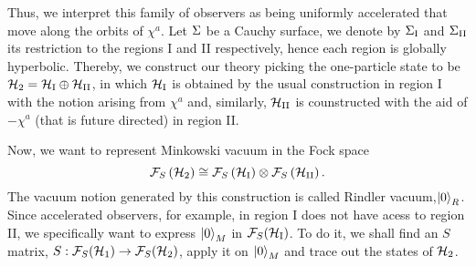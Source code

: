 Thus, we interpret this family of observers as being uniformly accelerated that move along the orbits of \(\chi^a\). Let \(\Sigma\) be a Cauchy surface, we denote by \(\Sigma_\text{I}\) and \(\Sigma_\text{II}\) its restriction to the regions I and II respectively, hence each region is globally hyperbolic. Thereby, we construct our theory picking the one-particle state to be \({\mathcal{H}}_2={\mathcal{H}}_\text{I}\oplus{\mathcal{H}}_\text{II}\), in which \({\mathcal{H}}_\text{I}\) is obtained by the usual construction in region I with the notion arising from \(\chi^a\) and, similarly, \({\mathcal{H}}_\text{II}\) is counstructed with the aid of \(-\chi^a\) (that is future directed) in region II.

Now, we want to represent Minkowski vacuum in the Fock space
\begin{equation}
    {\mathcal{F}}_S\left({\mathcal{H}}_2\right)\cong{\mathcal{F}}_S\left({\mathcal{H}}_\text{I}\right)\otimes{\mathcal{F}}_S\left({\mathcal{H}}_\text{II}\right).
\end{equation}
The vacuum notion generated by this construction is called Rindler vacuum,\(\ket{0}_R\). Since accelerated observers, for example, in region I does not have acess to region II, we specifically want to express \(\ket{0}_M\) in \({\mathcal{F}}_S({\mathcal{H}}_\text{I})\). To do it, we shall find an \(S\) matrix, \(S:{\mathcal{F}}_S({\mathcal{H}}_1)\to{\mathcal{F}}_S({\mathcal{H}}_2)\), apply it on \(\ket{0}_M\) and trace out the states of \({\mathcal{H}}_2\).

